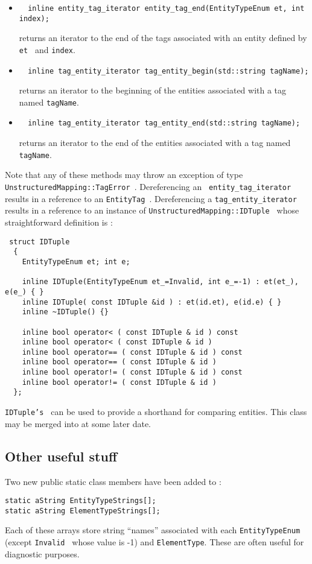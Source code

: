 \begin{itemize}
\item \begin{verbatim}  inline entity_tag_iterator entity_tag_end(EntityTypeEnum et, int index); \end{verbatim}
returns an iterator to the end of the tags associated with an entity defined by {\tt et } and {\tt index}.

\item \begin{verbatim}  inline tag_entity_iterator tag_entity_begin(std::string tagName); \end{verbatim}
returns an iterator to the beginning of the entities associated with a tag named {\tt tagName}.
  
\item \begin{verbatim}  inline tag_entity_iterator tag_entity_end(std::string tagName); \end{verbatim}
returns an iterator to the end of the entities associated with a tag named {\tt tagName}.

\end{itemize}

Note that any of these methods may throw an exception of type {\tt
UnstructuredMapping::TagError }.  Dereferencing an {\tt
entity\_tag\_iterator } results in a reference to an {\tt EntityTag }.
Dereferencing a {\tt tag\_entity\_iterator } results in a reference to
an instance of {\tt UnstructuredMapping::IDTuple } whose
straightforward definition is :
\begin{verbatim}
 struct IDTuple 
  { 
    EntityTypeEnum et; int e; 

    inline IDTuple(EntityTypeEnum et_=Invalid, int e_=-1) : et(et_), e(e_) { }
    inline IDTuple( const IDTuple &id ) : et(id.et), e(id.e) { }
    inline ~IDTuple() {}
    
    inline bool operator< ( const IDTuple & id ) const 
    inline bool operator< ( const IDTuple & id ) 
    inline bool operator== ( const IDTuple & id ) const 
    inline bool operator== ( const IDTuple & id ) 
    inline bool operator!= ( const IDTuple & id ) const 
    inline bool operator!= ( const IDTuple & id ) 
  };
\end{verbatim}
{\tt IDTuple's } can be used to provide a shorthand for comparing
entities. This class may be merged into \umapI at some later date.

\subsection{Other useful stuff}
Two new public static class members have been added to \umap :
\begin{verbatim}
static aString EntityTypeStrings[];
static aString ElementTypeStrings[];
\end{verbatim}
Each of these arrays store string ``names'' associated with each {\tt EntityTypeEnum }
(except {\tt Invalid } whose value is -1) and {\tt ElementType}.  These are often useful
for diagnostic purposes.

